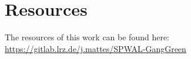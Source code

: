 \documentclass[acmlarge]{acmart}
\begin{document}
\renewcommand{\shortauthors}{A. Baier et al.}

%








\section{Resources}

The resources of this work can be found here: \url{https://gitlab.lrz.de/j.mattes/SPWAL-GangGreen}

\end{document}
